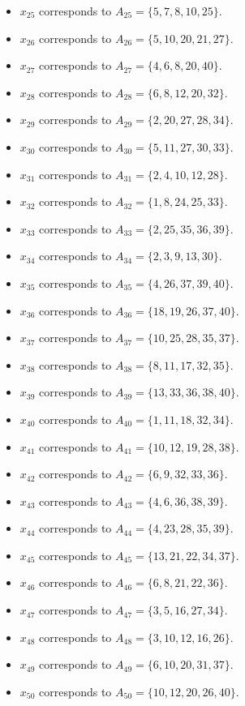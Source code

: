 \documentclass[11pt]{article}
\begin{document}
\begin{itemize}
\item $x_{25}$ corresponds to $A_{25}=\{5, 7, 8, 10, 25\}$.
\item $x_{26}$ corresponds to $A_{26}=\{5, 10, 20, 21, 27\}$.
\item $x_{27}$ corresponds to $A_{27}=\{4, 6, 8, 20, 40\}$.
\item $x_{28}$ corresponds to $A_{28}=\{6, 8, 12, 20, 32\}$.
\item $x_{29}$ corresponds to $A_{29}=\{2, 20, 27, 28, 34\}$.
\item $x_{30}$ corresponds to $A_{30}=\{5, 11, 27, 30, 33\}$.
\item $x_{31}$ corresponds to $A_{31}=\{2, 4, 10, 12, 28\}$.
\item $x_{32}$ corresponds to $A_{32}=\{1, 8, 24, 25, 33\}$.
\item $x_{33}$ corresponds to $A_{33}=\{2, 25, 35, 36, 39\}$.
\item $x_{34}$ corresponds to $A_{34}=\{2, 3, 9, 13, 30\}$.
\item $x_{35}$ corresponds to $A_{35}=\{4, 26, 37, 39, 40\}$.
\item $x_{36}$ corresponds to $A_{36}=\{18, 19, 26, 37, 40\}$.
\item $x_{37}$ corresponds to $A_{37}=\{10, 25, 28, 35, 37\}$.
\item $x_{38}$ corresponds to $A_{38}=\{8, 11, 17, 32, 35\}$.
\item $x_{39}$ corresponds to $A_{39}=\{13, 33, 36, 38, 40\}$.
\item $x_{40}$ corresponds to $A_{40}=\{1, 11, 18, 32, 34\}$.
\item $x_{41}$ corresponds to $A_{41}=\{10, 12, 19, 28, 38\}$.
\item $x_{42}$ corresponds to $A_{42}=\{6, 9, 32, 33, 36\}$.
\item $x_{43}$ corresponds to $A_{43}=\{4, 6, 36, 38, 39\}$.
\item $x_{44}$ corresponds to $A_{44}=\{4, 23, 28, 35, 39\}$.
\item $x_{45}$ corresponds to $A_{45}=\{13, 21, 22, 34, 37\}$.
\item $x_{46}$ corresponds to $A_{46}=\{6, 8, 21, 22, 36\}$.
\item $x_{47}$ corresponds to $A_{47}=\{3, 5, 16, 27, 34\}$.
\item $x_{48}$ corresponds to $A_{48}=\{3, 10, 12, 16, 26\}$.
\item $x_{49}$ corresponds to $A_{49}=\{6, 10, 20, 31, 37\}$.
\item $x_{50}$ corresponds to $A_{50}=\{10, 12, 20, 26, 40\}$.

\end{itemize}
\end{document}
